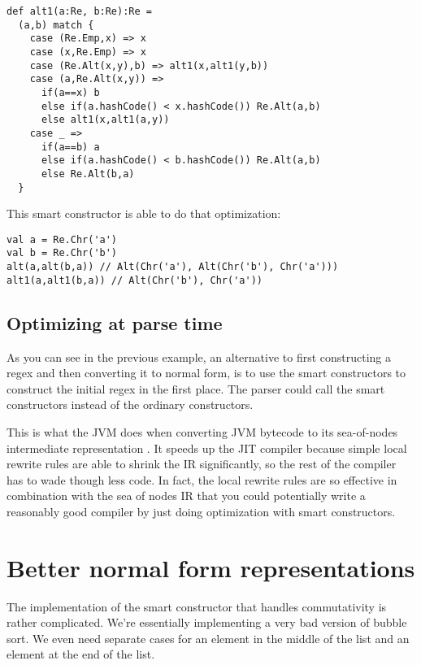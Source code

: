 \begin{lstlisting}
def alt1(a:Re, b:Re):Re =
  (a,b) match {
    case (Re.Emp,x) => x
    case (x,Re.Emp) => x
    case (Re.Alt(x,y),b) => alt1(x,alt1(y,b))
    case (a,Re.Alt(x,y)) =>
      if(a==x) b
      else if(a.hashCode() < x.hashCode()) Re.Alt(a,b)
      else alt1(x,alt1(a,y))
    case _ =>
      if(a==b) a
      else if(a.hashCode() < b.hashCode()) Re.Alt(a,b)
      else Re.Alt(b,a)
  }
\end{lstlisting}

This smart constructor is able to do that optimization:

\begin{minipage}{\textwidth}\begin{lstlisting}
val a = Re.Chr('a')
val b = Re.Chr('b')
alt(a,alt(b,a)) // Alt(Chr('a'), Alt(Chr('b'), Chr('a')))
alt1(a,alt1(b,a)) // Alt(Chr('b'), Chr('a'))
\end{lstlisting}\end{minipage}

\subsection{Optimizing at parse time}

As you can see in the previous example, an alternative to first constructing a regex and then converting it to normal form, is to use the smart constructors to construct the initial regex in the first place. The parser could call the smart constructors instead of the ordinary constructors.

This is what the JVM does when converting JVM bytecode to its sea-of-nodes intermediate representation \cite{click95}. It speeds up the JIT compiler because simple local rewrite rules are able to shrink the IR significantly, so the rest of the compiler has to wade though less code. In fact, the local rewrite rules are so effective in combination with the sea of nodes IR that you could potentially write a reasonably good compiler by just doing optimization with smart constructors.


\section{Better normal form representations}

The implementation of the smart constructor that handles commutativity is rather complicated. We're essentially implementing a very bad version of bubble sort. We even need separate cases for an element in the middle of the list and an element at the end of the list.

